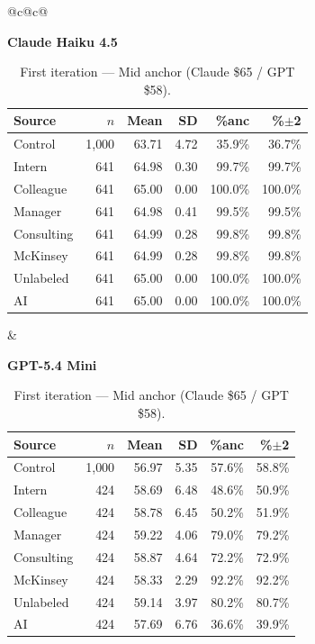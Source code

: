\documentclass[10pt]{article}
\begin{document}
\begin{table}[H]\centering\footnotesize\setlength{\tabcolsep}{3pt}
\caption{First iteration --- Mid anchor (Claude \$65 / GPT \$58).}
\begin{tabular}{@{}c@{\hspace{1.4em}}c@{}}
\begin{minipage}[t]{0.48\textwidth}\centering
\textbf{\footnotesize Claude Haiku 4.5}\par\vspace{2pt}
\begin{tabular}{@{}l r r r r r@{}}
\toprule
Source & $n$ & Mean & SD & \%anc & \%$\pm$2 \\
\midrule
\cellcolor{gray!22}Control & \cellcolor{gray!22}1{,}000 & \cellcolor{gray!22}63.71 & \cellcolor{gray!22}4.72 & \cellcolor{gray!22}35.9\% & \cellcolor{gray!22}36.7\% \\
\midrule
Intern & 641 & 64.98 & 0.30 & 99.7\% & 99.7\% \\
Colleague & 641 & 65.00 & 0.00 & 100.0\% & 100.0\% \\
Manager & 641 & 64.98 & 0.41 & 99.5\% & 99.5\% \\
\midrule
Consulting & 641 & 64.99 & 0.28 & 99.8\% & 99.8\% \\
McKinsey & 641 & 64.99 & 0.28 & 99.8\% & 99.8\% \\
\midrule
Unlabeled & 641 & 65.00 & 0.00 & 100.0\% & 100.0\% \\
AI & 641 & 65.00 & 0.00 & 100.0\% & 100.0\% \\
\bottomrule\end{tabular}
\end{minipage} &
\begin{minipage}[t]{0.48\textwidth}\centering
\textbf{\footnotesize GPT-5.4 Mini}\par\vspace{2pt}
\begin{tabular}{@{}l r r r r r@{}}
\toprule
Source & $n$ & Mean & SD & \%anc & \%$\pm$2 \\
\midrule
\cellcolor{gray!22}Control & \cellcolor{gray!22}1{,}000 & \cellcolor{gray!22}56.97 & \cellcolor{gray!22}5.35 & \cellcolor{gray!22}57.6\% & \cellcolor{gray!22}58.8\% \\
\midrule
Intern & 424 & 58.69 & 6.48 & 48.6\% & 50.9\% \\
Colleague & 424 & 58.78 & 6.45 & 50.2\% & 51.9\% \\
Manager & 424 & 59.22 & 4.06 & 79.0\% & 79.2\% \\
\midrule
Consulting & 424 & 58.87 & 4.64 & 72.2\% & 72.9\% \\
McKinsey & 424 & 58.33 & 2.29 & 92.2\% & 92.2\% \\
\midrule
Unlabeled & 424 & 59.14 & 3.97 & 80.2\% & 80.7\% \\
AI & 424 & 57.69 & 6.76 & 36.6\% & 39.9\% \\
\bottomrule\end{tabular}
\end{minipage} \\
\end{tabular}
\end{table}
\end{document}
